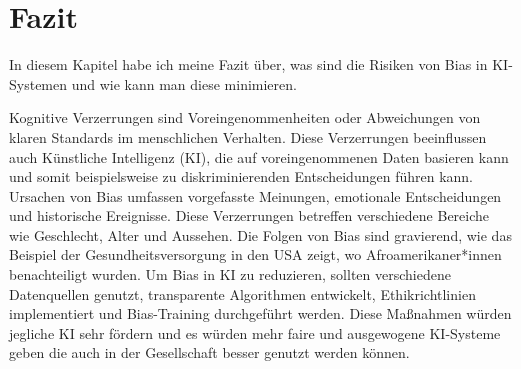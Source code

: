 \newpage
\chapter{Fazit}
In diesem Kapitel habe ich meine Fazit über, was sind die Risiken von Bias in KI-Systemen
und wie kann man diese minimieren.

\vspace{5mm}Kognitive Verzerrungen sind Voreingenommenheiten oder Abweichungen von klaren 
Standards im menschlichen Verhalten. Diese Verzerrungen beeinflussen 
auch Künstliche Intelligenz (KI), die auf voreingenommenen Daten basieren
kann und somit beispielsweise zu diskriminierenden Entscheidungen führen kann.
Ursachen von Bias umfassen vorgefasste Meinungen, emotionale 
Entscheidungen und historische Ereignisse. Diese Verzerrungen 
betreffen verschiedene Bereiche wie Geschlecht, Alter und Aussehen.
Die Folgen von Bias sind gravierend, wie das Beispiel der 
Gesundheitsversorgung in den USA zeigt, wo Afroamerikaner*innen benachteiligt wurden.
Um Bias in KI zu reduzieren, sollten verschiedene Datenquellen genutzt, 
transparente Algorithmen entwickelt, Ethikrichtlinien implementiert
und Bias-Training durchgeführt werden. Diese Maßnahmen würden jegliche KI sehr fördern 
und es würden mehr faire und ausgewogene KI-Systeme geben die auch in der Gesellschaft besser genutzt werden
können.